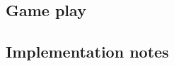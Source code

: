 \subsection{Game play}\label{subsec:game-play-current}


\subsection{Implementation notes}\label{subsec:current:impl}
